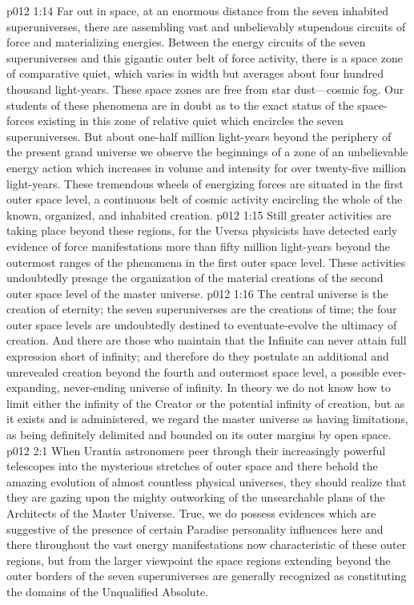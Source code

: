 \vs p012 1:14  Far out in space, at an enormous distance from the seven inhabited superuniverses, there are assembling vast and unbelievably stupendous circuits of force and materializing energies. Between the energy circuits of the seven superuniverses and this gigantic outer belt of force activity, there is a space zone of comparative quiet, which varies in width but averages about four hundred thousand light\hyp{}years. These space zones are free from star dust---cosmic fog. Our students of these phenomena are in doubt as to the exact status of the space\hyp{}forces existing in this zone of relative quiet which encircles the seven superuniverses. But about one\hyp{}half million light\hyp{}years beyond the periphery of the present grand universe we observe the beginnings of a zone of an unbelievable energy action which increases in volume and intensity for over twenty\hyp{}five million light\hyp{}years. These tremendous wheels of energizing forces are situated in the first outer space level, a continuous belt of cosmic activity encircling the whole of the known, organized, and inhabited creation.
\vs p012 1:15 Still greater activities are taking place beyond these regions, for the Uversa physicists have detected early evidence of force manifestations more than fifty million light\hyp{}years beyond the outermost ranges of the phenomena in the first outer space level. These activities undoubtedly presage the organization of the material creations of the second outer space level of the master universe.
\vs p012 1:16 The central universe is the creation of eternity; the seven superuniverses are the creations of time; the four outer space levels are undoubtedly destined to eventuate\hyp{}evolve the ultimacy of creation. And there are those who maintain that the Infinite can never attain full expression short of infinity; and therefore do they postulate an additional and unrevealed creation beyond the fourth and outermost space level, a possible ever\hyp{}expanding, never\hyp{}ending universe of infinity. In theory we do not know how to limit either the infinity of the Creator or the potential infinity of creation, but as it exists and is administered, we regard the master universe as having limitations, as being definitely delimited and bounded on its outer margins by open space.
\vs p012 2:1 When Urantia astronomers peer through their increasingly powerful telescopes into the mysterious stretches of outer space and there behold the amazing evolution of almost countless physical universes, they should realize that they are gazing upon the mighty outworking of the unsearchable plans of the Architects of the Master Universe. True, we do possess evidences which are suggestive of the presence of certain Paradise personality influences here and there throughout the vast energy manifestations now characteristic of these outer regions, but from the larger viewpoint the space regions extending beyond the outer borders of the seven superuniverses are generally recognized as constituting the domains of the Unqualified Absolute.
